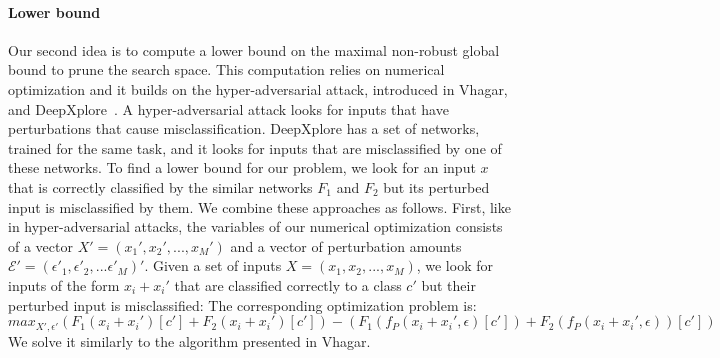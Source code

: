 \paragraph{Lower bound}
Our second idea is to compute a lower bound on the maximal non-robust global bound to prune the search space. 
This computation relies on numerical optimization and it builds on the hyper-adversarial attack, introduced in Vhagar, and DeepXplore~\cite{DEEPXPLORE}. %
A hyper-adversarial attack looks for inputs that have perturbations that cause misclassification.
DeepXplore has a set of networks, trained for the same task, and it looks for inputs that are misclassified by one of these networks. 
To find a lower bound for our problem, we look for an input $x$ that is correctly classified by the similar networks $F_1$ and $F_2$ but its perturbed input is misclassified by them. %
We combine these approaches as follows. First, like in hyper-adversarial attacks, the variables of our numerical optimization consists of a vector $X'=(x_1',x_2',...,x_M')$ and a vector of perturbation amounts $\mathcal{E}'=(\epsilon'_1,\epsilon'_2,...\epsilon'_M)'$.
Given a set of inputs $X=(x_1,x_2,...,x_M)$, we look for inputs of the form $x_i+x_i'$ that are classified correctly to a class $c'$ but their perturbed input is misclassified: 
The corresponding optimization problem is:
$$max_{X',\epsilon'} (F_1(x_i+x_i')[c']+F_2(x_i+x_i')[c'])-(F_1(f_P(x_i+x_i',\epsilon)[c'])+F_2(f_P(x_i+x_i',\epsilon))[c'])$$
We solve it similarly to the algorithm presented in Vhagar.
